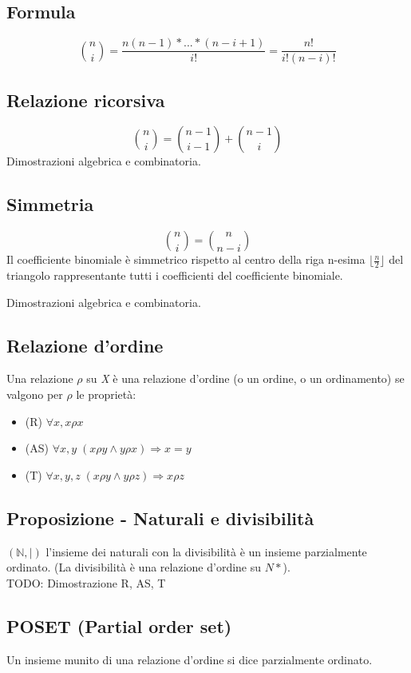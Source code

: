 \subsection{Formula} 
\[\binom{n}{i}=\frac{n(n-1)\ast ... \ast (n-i+1)}{i!} = \frac{n!}{i!(n-i)!}\]

\subsection{Relazione ricorsiva}
\[\binom{n}{i}=\binom{n-1}{i-1}+\binom{n-1}{i}\]
Dimostrazioni algebrica e combinatoria.

\subsection{Simmetria}
\[\binom{n}{i}=\binom{n}{n-i}\]
Il coefficiente binomiale è simmetrico rispetto al centro della riga n-esima \(\lfloor\frac{n}{2}\rfloor\) del triangolo rappresentante tutti i coefficienti del coefficiente binomiale.

Dimostrazioni algebrica e combinatoria.

\subsection{Relazione d'ordine}
Una relazione \(\rho\) su \textit{X} è una relazione d'ordine (o un ordine, o un ordinamento) se valgono per \(\rho\) le proprietà:
\begin{itemize}
    \item (R) \(\forall x, x\rho x\)
    \item (AS) \(\forall x,y\; (x\rho y\land y\rho x)\Rightarrow x=y\)
    \item (T) \(\forall x,y,z\; (x\rho y\land y\rho z)\Rightarrow x\rho z\)
\end{itemize}

\subsection{Proposizione - Naturali e divisibilità}
$(\mathbb{N}, |)$ l'insieme dei naturali con la divisibilità è un insieme parzialmente ordinato. (La divisibilità è una relazione d'ordine su $N*$).
\\TODO: Dimostrazione R, AS, T

\subsection{POSET (Partial order set)}
Un insieme munito di una relazione d'ordine si dice parzialmente ordinato.

